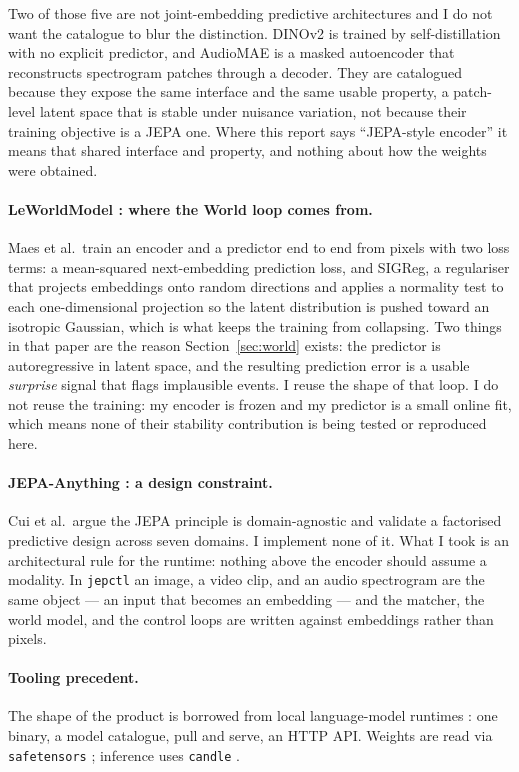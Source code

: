 \documentclass[11pt,onecolumn]{article}
\newcommand{\jepctl}{\texttt{jepctl}}
\newcommand{\code}[1]{\texttt{#1}}
\begin{document}
Two of those five are not joint-embedding predictive architectures and I do not want the
catalogue to blur the distinction. DINOv2 is trained by self-distillation with no explicit
predictor, and AudioMAE is a masked autoencoder that reconstructs spectrogram patches
through a decoder. They are catalogued because they expose the same interface and the same
usable property, a patch-level latent space that is stable under nuisance variation, not
because their training objective is a JEPA one. Where this report says ``JEPA-style
encoder'' it means that shared interface and property, and nothing about how the weights
were obtained.

\paragraph{LeWorldModel \cite{lewm2026}: where the World loop comes from.}
Maes et al.\ train an encoder and a predictor end to end from pixels with two loss terms:
a mean-squared next-embedding prediction loss, and SIGReg, a regulariser that projects
embeddings onto random directions and applies a normality test to each one-dimensional
projection so the latent distribution is pushed toward an isotropic Gaussian, which is
what keeps the training from collapsing. Two things in that paper are the reason
Section~\ref{sec:world} exists: the predictor is autoregressive in latent space, and the
resulting prediction error is a usable \emph{surprise} signal that flags implausible
events. I reuse the shape of that loop. I do not reuse the training: my encoder is frozen
and my predictor is a small online fit, which means none of their stability contribution
is being tested or reproduced here.

\paragraph{JEPA-Anything \cite{jepaanything2026}: a design constraint.}
Cui et al.\ argue the JEPA principle is domain-agnostic and validate a factorised
predictive design across seven domains. I implement none of it. What I took is an
architectural rule for the runtime: nothing above the encoder should assume a modality.
In \jepctl{} an image, a video clip, and an audio spectrogram are the same object --- an
input that becomes an embedding --- and the matcher, the world model, and the control
loops are written against embeddings rather than pixels.

\paragraph{Tooling precedent.}
The shape of the product is borrowed from local language-model runtimes \cite{ollama}:
one binary, a model catalogue, pull and serve, an HTTP API. Weights are read via
\code{safetensors} \cite{safetensors}; inference uses \code{candle} \cite{candle}.
\end{document}
